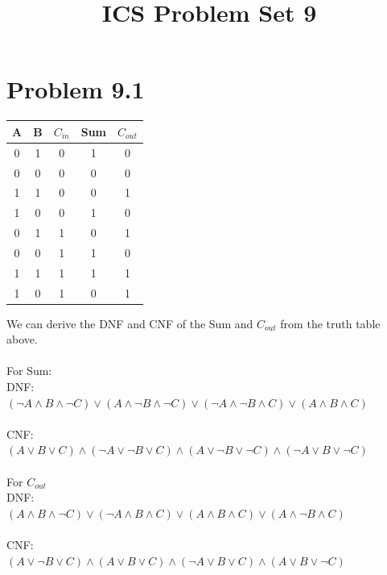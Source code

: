 \documentclass{article}
\begin{document}
    \title{\textbf{ICS Problem Set 9}}
    \maketitle
    \section{\textbf{Problem 9.1}}
    \begin{center}
        \begin{tabular}{| c | c | c | c | c |}
            \hline
            A & B & $C_{in}$ & Sum & $C_{out}$\\
            \hline
            0 & 1 & 0 & 1 & 0\\
            0 & 0 & 0 & 0 & 0\\
            1 & 1 & 0 & 0 & 1\\
            1 & 0 & 0 & 1 & 0\\
            0 & 1 & 1 & 0 & 1\\
            0 & 0 & 1 & 1 & 0\\
            1 & 1 & 1 & 1 & 1\\
            1 & 0 & 1 & 0 & 1\\
            \hline
        \end{tabular}
    \end{center}
    We can derive the DNF and CNF of the Sum and $C_{out}$ from the truth table above.\\
    \\
    For Sum:\\
    DNF:\\
    $(\neg A \land B \land \neg C) \lor (A \land \neg B \land \neg C) \lor (\neg A \land \neg B \land C) \lor (A \land B \land C)$\\
    \\
    CNF:\\
    $(A \lor B \lor C) \land (\neg A \lor \neg B \lor C) \land (A \lor \neg B \lor \neg C) \land (\neg A \lor B \lor \neg C)$\\
    \\
    For $C_{out}$\\
    DNF:\\
    $(A \land B \land \neg C) \lor (\neg A \land B \land C) \lor (A \land B \land C) \lor (A \land \neg B \land C)$\\
    \\
    CNF:\\
    $(A \lor \neg B \lor C) \land (A \lor B \lor C) \land (\neg A \lor B \lor C) \land (A \lor B \lor \neg C)$\\
    \\
    
\end{document}
